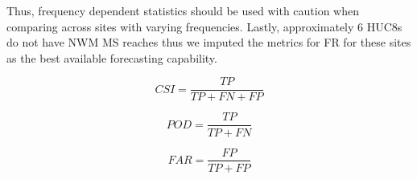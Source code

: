 Thus, frequency dependent statistics should be used with caution when comparing across sites with varying frequencies. 
Lastly, approximately 6 HUC8s do not have NWM MS reaches thus we imputed the metrics for FR for these sites as the best available forecasting capability.
%
\begin{linenomath*}
\begin{equation}
\label{eq:csi}
CSI = \frac{TP}{TP + FN + FP}
\end{equation}
\end{linenomath*}
%
\begin{linenomath*}
\begin{equation}
\label{eq:pod}
POD = \frac{TP}{TP + FN}
\end{equation}
\end{linenomath*}
%
\begin{linenomath*}
\begin{equation}
\label{eq:far}
FAR = \frac{FP}{TP + FP}
\end{equation}
\end{linenomath*}
%
